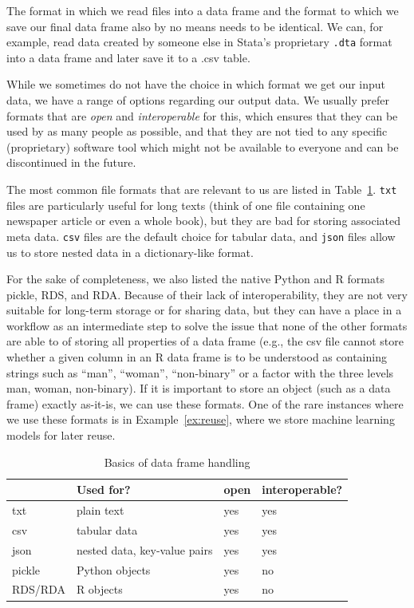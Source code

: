 The format in which we read files into a data frame and the format to which we save our final data frame also by no means needs to be identical. We can, for example, read data created by someone else in Stata's proprietary \texttt{\small{.dta}} format into a data frame and later save it to a .csv table.

While we sometimes do not have the choice in which format we get our input data, we have a range of options regarding our output data. We usually prefer formats that are \emph{open} and \emph{interoperable} for this, which ensures that they can be used by as many people as possible, and that they are not tied to any specific (proprietary) software tool which might not be available to everyone and can be discontinued in the future.

The most common file formats that are relevant to us are listed in Table~\ref{tab:fileformats}. \texttt{\small{txt}} files are particularly useful for long texts (think of one file containing one newspaper article or even a whole book), but they are bad for storing associated meta data. \texttt{\small{csv}} files are the default choice for tabular data, and \texttt{\small{json}} files allow us to store nested data in a dictionary-like format.

For the sake of completeness, we also listed the native Python and R formats pickle, RDS, and RDA. Because of their lack of interoperability, they are not very suitable for long-term storage or for sharing data, but they can have a place in a workflow as an intermediate step to solve the issue that none of the other formats are able to of storing all properties of a data frame (e.g., the csv file cannot store whether a given column in an R data frame is to be understood as containing strings such as ``man'', ``woman'', ``non-binary'' or a factor with the three levels man, woman, non-binary). If it is important to store an object (such as a data frame) exactly as-it-is, we can use these formats. One of the rare instances where we use these formats is in Example~\ref{ex:reuse}, where we store machine learning models for later reuse.

\begin{table}[]
\caption{Basics of data frame handling \label{tab:fileformats}}{%
\begin{tabular}{@{}llll@{}}
\toprule
        & Used for?             & open   & interoperable?\\ \midrule
txt     & plain text            &yes & yes            \\
csv     & tabular data          & yes & yes            \\
json    & nested data, key-value pairs   & yes & yes             \\
pickle  & Python objects        & yes & no     \\
RDS/RDA & R objects             & yes & no \\ \bottomrule
\end{tabular}}{}
\end{table}


